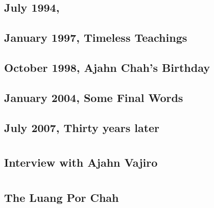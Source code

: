 \documentclass[
  pagePreset=smallpage,
  babelLanguage=british,
]{aruno-anecdote}
\begin{document}
\chapter[July 1994, Recollections by Greg Klein]{July 1994,\newline {}}


\chapter{January 1997, Timeless Teachings}


\chapter{October 1998, Ajahn Chah's Birthday}


\chapter{January 2004, Some Final Words}


\chapter{July 2007, Thirty years later}


\part{\space}

\chapter{Interview with Ajahn Vajiro}


\part{\space}

\chapter[The Luang Por Chah Memorial Week]{The Luang Por Chah\newline {}}


\emptypage


\backmatter



\cleartorecto
\thispagestyle{plain}


\clearpage
\thispagestyle{empty}
\mbox{}
\end{document}
